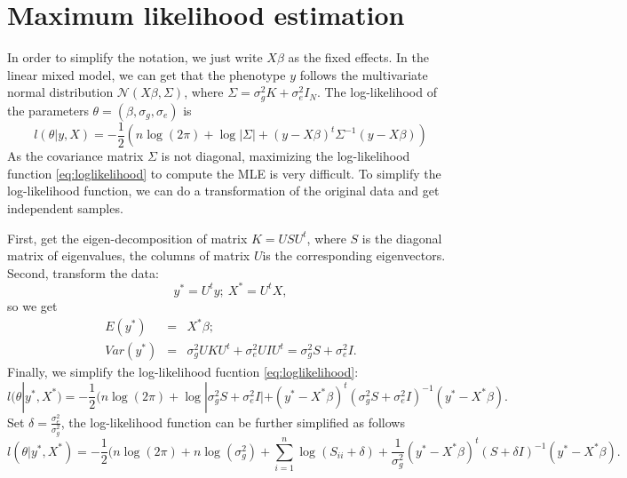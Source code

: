 \documentclass[12pt]{article}
\def\N{\mathcal{N}}
\numberwithin{equation}{section}
\begin{document}
\section{Maximum likelihood estimation}
In order to simplify the notation, we just write $X\beta$  as the fixed effects. In the linear mixed model, we can get that the phenotype $y$ follows the multivariate normal distribution $\N(X\beta,\Sigma)$, where $\Sigma=\sigma_g^2K+\sigma_e^2I_N$. The log-likelihood of the parameters $\theta=(\beta,\sigma_g,\sigma_e)$ is 
\begin{equation}
\label{eq:loglikelihood}
l(\theta|y,X)=-\frac{1}{2}(n\log(2\pi)+\log |\Sigma|+(y-X\beta)^t\Sigma^{-1}(y-X\beta))
\end{equation}
As the covariance matrix $\Sigma$ is not diagonal, maximizing the log-likelihood function \ref{eq:loglikelihood} to compute the MLE is very difficult. To simplify the log-likelihood function, we can do a transformation of the original data and get independent samples.

First, get the eigen-decomposition of matrix $K=USU^t$, where $S$ is the diagonal matrix of eigenvalues, the columns of matrix $U$is the corresponding eigenvectors. Second, transform the data: $$y^*=U^ty;\ X^*=U^tX,$$
so we get
\[
\begin{array}{lcl}
E(y^*) &=& X^*\beta;\\
Var(y^*) &=& \sigma_g^2UKU^t+\sigma_e^2UIU^t =\sigma_g^2S+\sigma_e^2I.
\end{array}
\]
Finally, we simplify the log-likelihood fucntion \ref{eq:loglikelihood}:
\begin{equation}
\label{eq:loglikelihood2}
l(\theta|y^*,X^*)=-\frac{1}{2}(n\log(2\pi)+\log |\sigma_g^2S+\sigma_e^2I|+(y^*-X^*\beta)^t(\sigma_g^2S+\sigma_e^2I)^{-1}(y^*-X^*\beta).
\end{equation} 
Set $\delta=\frac{\sigma_e^2}{\sigma_g^2}$, the log-likelihood function can be further simplified as follows
\begin{equation}
\label{eq:loglikelihood3}
l(\theta|y^*,X^*)=-\frac{1}{2}(n\log(2\pi)+n\log(\sigma_g^2)+\sum_{i=1}^n\log (S_{ii}+\delta)+\frac{1}{\sigma_g^2}(y^*-X^*\beta)^t(S+\delta I)^{-1}(y^*-X^*\beta).
\end{equation}
\end{document}
